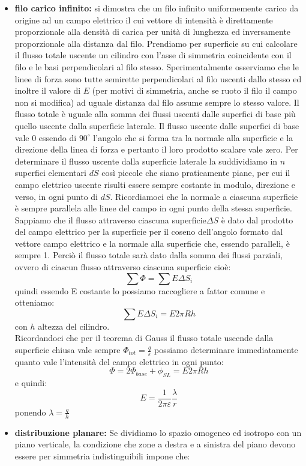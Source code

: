 \documentclass[a4paper,12pt, oneside]{book}
\begin{document}
\begin{itemize}
	\item \textbf{filo carico infinito:} si dimostra che un filo infinito uniformemente carico da origine ad un campo elettrico il cui vettore di intensità è direttamente proporzionale alla densità di carica per unità di lunghezza ed inversamente proporzionale alla distanza dal filo. Prendiamo per superficie su cui calcolare il flusso totale uscente un cilindro con l'asse di simmetria coincidente con il filo e le basi perpendicolari al filo stesso. Sperimentalmente osserviamo che le linee di forza sono tutte semirette perpendicolari al filo uscenti dallo stesso ed inoltre il valore di $E$ (per motivi di simmetria, anche se ruoto il filo il campo non si modifica) ad uguale distanza dal filo assume sempre lo stesso valore. Il flusso totale è uguale alla somma dei flussi uscenti dalle superfici di base più quello uscente dalla superficie laterale. Il flusso uscente dalle superfici di base vale 0 essendo di $90^{\circ}$ l'angolo che si forma tra la normale alla superficie e la direzione della linea di forza e pertanto il loro prodotto scalare vale zero. Per determinare il flusso uscente dalla superficie laterale la suddividiamo in $n$ superfici elementari $dS$ così piccole che siano praticamente piane, per cui il campo elettrico uscente risulti essere sempre costante in modulo, direzione e verso, in ogni punto di $dS$. Ricordiamoci che la normale a ciascuna superficie è sempre parallela alle linee del campo in ogni punto della stessa superficie. Sappiamo che il flusso attraverso ciascuna superficie$\Delta S$ è dato dal prodotto del campo elettrico per la superficie per il coseno dell’angolo formato dal vettore campo elettrico e la normale alla superficie che, essendo paralleli, è sempre 1. Perciò il flusso totale sarà dato dalla somma dei flussi parziali, ovvero di ciascun flusso attraverso ciascuna superficie cioè:
	      $$\sum \Phi=\sum E\Delta S_i$$
	      quindi essendo E costante lo possiamo raccogliere a fattor comune e otteniamo:
	      $$\sum E\Delta S_i=E2\pi Rh$$
	      con $h$ altezza del cilindro.\\
	      Ricordandoci che per il teorema di Gauss il flusso totale uscende dalla superficie chiusa vale sempre $\Phi_{tot}=\frac{q}{\varepsilon}$  possiamo determinare immediatamente quanto vale l'intensità del campo elettrico in ogni punto:
	      $$\Phi=2\Phi_{base}+\phi_{SL}=E2\pi Rh$$
	      e quindi:
	      $$E=\frac{1}{2\pi\varepsilon}\frac{\lambda}{r}$$
	      ponendo $\lambda=\frac{q}{h}$
	\item \textbf{distribuzione planare:} Se dividiamo lo spazio omogeneo ed isotropo con un piano verticale, la condizione che zone a destra e a sinistra del piano devono essere per simmetria indistinguibili impone che:

\end{itemize}
\end{document}
